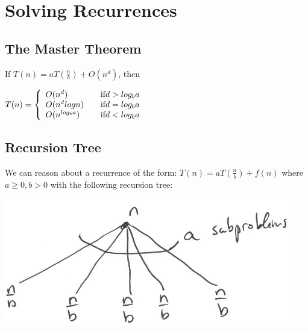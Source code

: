 \chapter{Solving Recurrences}

\section{The Master Theorem}

If $T(n) = aT(\frac{n}{b}) + O(n^d)$, then

\begin{math}
T(n) = \left\{
\begin{array}{l l}
O(n^d)       & \quad \text{if} d > log_ba \\
O(n^d logn)  & \quad \text{if} d = log_ba \\
O(n^{log_ba}) & \quad \text{if} d < log_ba \\
\end{array} \right.
\end{math}

\section{Recursion Tree}

We can reason about a recurrence of the form: $ T(n) = aT(\frac{n}{b})
+ f(n) $ where $ a \geq 0, b > 0 $ with the following recursion tree:

{
  \includegraphics[scale=1.2]{recursion_tree}
  \label{fig:recursion_tree}
}
